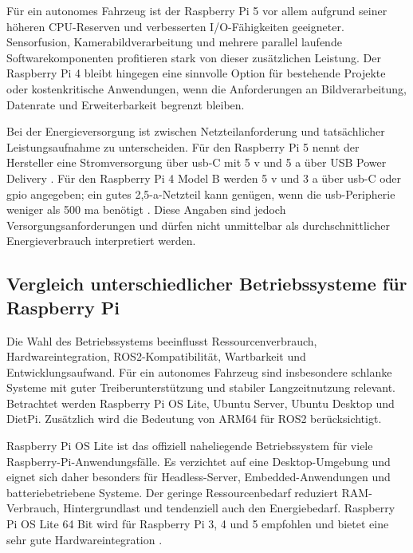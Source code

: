 Für ein autonomes Fahrzeug ist der Raspberry Pi 5 vor allem aufgrund seiner höheren CPU-Reserven und verbesserten I/O-Fähigkeiten geeigneter. Sensorfusion, Kamerabildverarbeitung und mehrere parallel laufende Softwarekomponenten profitieren stark von dieser zusätzlichen Leistung. Der Raspberry Pi 4 bleibt hingegen eine sinnvolle Option für bestehende Projekte oder kostenkritische Anwendungen, wenn die Anforderungen an Bildverarbeitung, Datenrate und Erweiterbarkeit begrenzt bleiben.

Bei der Energieversorgung ist zwischen Netzteilanforderung und tatsächlicher Leistungsaufnahme zu unterscheiden. Für den Raspberry Pi 5 nennt der Hersteller eine Stromversorgung über \gls{usb}-C mit 5 \gls{v} und 5 \gls{a} über USB Power Delivery \cite[Abschnitt ``Specification'']{zotero-item-144}. Für den Raspberry Pi 4 Model B werden 5 \gls{v} und 3 \gls{a} über \gls{usb}-C oder \gls{gpio} angegeben; ein gutes 2,5-\gls{a}-Netzteil kann genügen, wenn die \gls{usb}-Peripherie weniger als 500 \gls{ma} benötigt \cite[Abschnitt ``Power requirements'']{zotero-item-150}. Diese Angaben sind jedoch Versorgungsanforderungen und dürfen nicht unmittelbar als durchschnittlicher Energieverbrauch interpretiert werden.

\subsection{Vergleich unterschiedlicher Betriebssysteme für Raspberry Pi}
\label{sec:os_vergleich}

Die Wahl des Betriebssystems beeinflusst Ressourcenverbrauch, Hardwareintegration, ROS2-Kompatibilität, Wartbarkeit und Entwicklungsaufwand. Für ein autonomes Fahrzeug sind insbesondere schlanke Systeme mit guter Treiberunterstützung und stabiler Langzeitnutzung relevant. Betrachtet werden Raspberry Pi OS Lite, Ubuntu Server, Ubuntu Desktop und DietPi. Zusätzlich wird die Bedeutung von ARM64 für ROS2 berücksichtigt.

Raspberry Pi OS Lite ist das offiziell naheliegende Betriebssystem für viele Raspberry-Pi-Anwendungsfälle. Es verzichtet auf eine Desktop-Umgebung und eignet sich daher besonders für Headless-Server, Embedded-Anwendungen und batteriebetriebene Systeme. Der geringe Ressourcenbedarf reduziert RAM-Verbrauch, Hintergrundlast und tendenziell auch den Energiebedarf. Raspberry Pi OS Lite 64 Bit wird für Raspberry Pi 3, 4 und 5 empfohlen und bietet eine sehr gute Hardwareintegration \cite[Abschnitte ``Raspberry Pi OS'', ``Raspberry Pi OS Full'' und ``Raspberry Pi OS Lite'']{zotero-item-149} \cite{zotero-item-151}.

